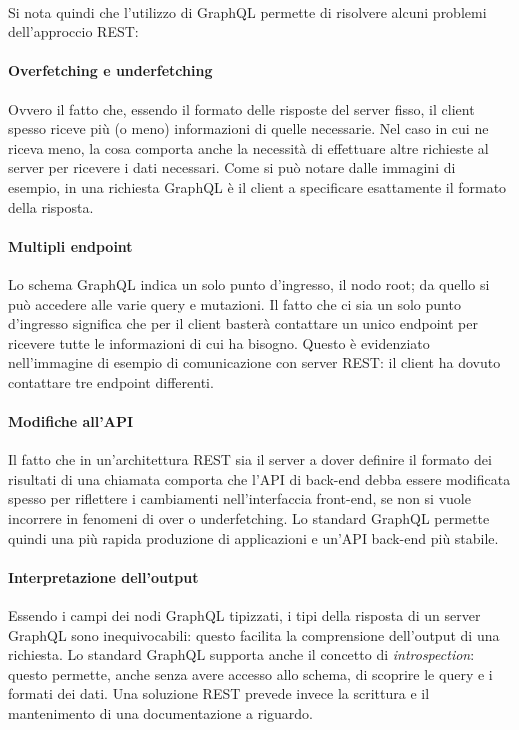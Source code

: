 \documentclass[a4paper, 12pt]{report}
\begin{document}
        \paragraph*{}Si nota quindi che l'utilizzo di GraphQL permette di risolvere alcuni problemi dell'approccio REST:
        \paragraph*{Overfetching e underfetching} 
          Ovvero il fatto che, essendo il formato delle risposte del server fisso, il client spesso riceve più (o meno) informazioni di quelle necessarie.
          Nel caso in cui ne riceva meno, la cosa comporta anche la necessità di effettuare altre richieste al server per ricevere i dati necessari.
          Come si può notare dalle immagini di esempio, in una richiesta GraphQL è il client a specificare esattamente il formato della risposta.
        \paragraph*{Multipli endpoint}
          Lo schema GraphQL indica un solo punto d'ingresso, il nodo root; da quello si può accedere alle varie query e mutazioni.
          Il fatto che ci sia un solo punto d'ingresso significa che per il client basterà contattare un unico endpoint per ricevere tutte le informazioni di cui ha bisogno.
          Questo è evidenziato nell'immagine di esempio di comunicazione con server REST: il client ha dovuto contattare tre endpoint differenti.
        \paragraph*{Modifiche all'API}
          Il fatto che in un'architettura REST sia il server a dover definire il formato dei risultati di una chiamata comporta che l'API di back-end debba essere modificata spesso per riflettere i cambiamenti nell'interfaccia front-end, se non si vuole
          incorrere in fenomeni di over o underfetching.
          Lo standard GraphQL permette quindi una più rapida produzione di applicazioni e un'API back-end più stabile.
        \paragraph*{Interpretazione dell'output}
          Essendo i campi dei nodi GraphQL tipizzati, i tipi della risposta di un server GraphQL sono inequivocabili: questo facilita la comprensione dell'output di una richiesta.
          Lo standard GraphQL supporta anche il concetto di \emph{introspection}: questo permette, anche senza avere accesso allo schema, di scoprire le query e i formati dei dati.
          Una soluzione REST prevede invece la scrittura e il mantenimento di una documentazione a riguardo.
\end{document}
